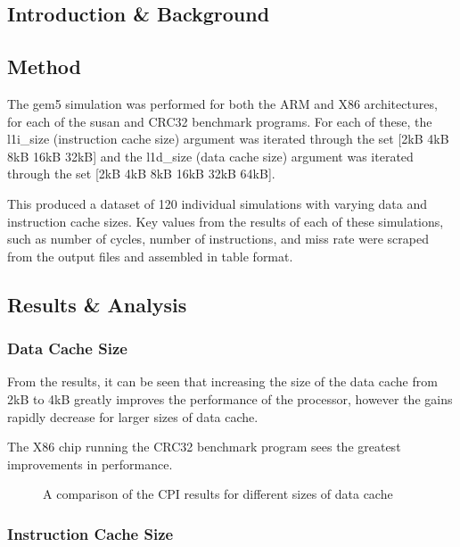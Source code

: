 
\subsection{Introduction \& Background}



\subsection{Method}

The gem5 simulation was performed for both the ARM and X86 architectures, for
each of the susan and CRC32 benchmark programs. For each of these, the l1i\_size 
(instruction cache size) argument was iterated through the set [2kB 4kB 8kB 16kB 32kB]
and the l1d\_size (data cache size) argument was iterated through the set [2kB 4kB 8kB 
16kB 32kB 64kB].

This produced a dataset of 120 individual simulations with varying data and instruction
cache sizes.
Key values from the results of each of these simulations, such as number of cycles, 
number of instructions, and miss rate were scraped from the output files and assembled 
in table format.

\subsection{Results \& Analysis}

\subsubsection{Data Cache Size}

From the results, it can be seen that increasing the size of the data cache from 2kB to 
4kB greatly improves the performance of the processor, however the gains rapidly 
decrease for larger sizes of data cache.

The X86 chip running the CRC32 benchmark program sees the greatest improvements in 
performance.

\begin{figure}
    \centering
    
    \caption{A comparison of the CPI results for different sizes of data cache}
    \label{fig:parta-l1d}
\end{figure}

\subsubsection{Instruction Cache Size}

